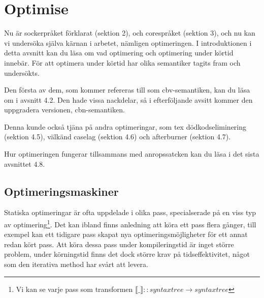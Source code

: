 \documentclass[Rapport]{subfiles}
\begin{document}
\section{Optimise}


\overviewOptimise

Nu är sockerpråket förklarat (sektion 2), och corespråket (sektion 3),
och nu kan vi undersöka själva kärnan i arbetet, nämligen optimeringen.
I introduktionen i detta avsnitt kan du läsa om vad optimering och 
optimering under körtid innebär. För att optimera under körtid har 
olika semantiker tagits fram och undersökts.
    
Den första av dem, som kommer refereras till som cbv-semantiken, 
kan du läsa om i avsnitt 4.2. Den hade vissa nackdelar, så i 
efterföljande avsitt kommer den uppgradera versionen, cbn-semantiken.

Denna kunde också tjäna på andra optimeringar, som tex
dödkodseliminering (sektion 4.5), 
välkänd caselag (sektion 4.6) och 
afterburner (sektion 4.7).

Hur optimeringen fungerar tillsammans med anropssatcken
kan du läsa i det sista avsnittet 4.8.





\subsection{Optimeringsmaskiner}

Statiska optimeringar är ofta uppdelade i olika pass, specialserade på en viss
typ av optimering\footnote{Vi kan se varje pass som transformen $\llbracket \_ \rrbracket :: syntaxtree \rightarrow syntaxtree$}. Det kan ibland finns anledning att köra ett pass flera gånger, till exempel kan ett tidigare pass skapat nya optimeringsmöjligheter för ett annat redan kört pass. Att köra dessa pass under kompileringstid är inget större problem, under körningstid finns det dock större krav på tidseffektivitet, något som den iterativa 
method har svårt att levera.
\end{document}
